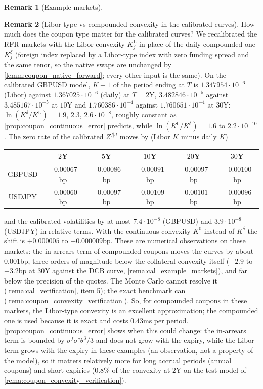 \documentclass[11pt,english]{amsart}
\theoremstyle{definition}
\newtheorem{rema}{Remark}
\begin{document}
\begin{rema}[Example markets]
\end{rema}

\begin{rema}[Libor-type vs compounded convexity in the calibrated curves]\label{rema:cal_libor_vs_rfr}
How much does the coupon type matter for the calibrated curves? We recalibrated the RFR markets with the Libor convexity $K^{\mathrm{L}}_j$ in place of the daily compounded one $K^\delta_j$ (foreign index replaced by a Libor-type index with zero funding spread and the same tenor, so the native swaps are unchanged by \autoref{lemm:coupon_native_forward}; every other input is the same). On the calibrated GBPUSD model, $K-1$ of the period ending at $T$ is $1.347954\cdot10^{-6}$ (Libor) against $1.367025\cdot10^{-6}$ (daily) at $T = 2$Y, $3.482846\cdot10^{-5}$ against $3.485167\cdot10^{-5}$ at $10$Y and $1.760386\cdot10^{-4}$ against $1.760651\cdot10^{-4}$ at $30$Y: $\ln(K^\delta/K^{\mathrm{L}}) = 1.9$, $2.3$, $2.6\cdot10^{-8}$, roughly constant as \autoref{prop:coupon_continuous_error} predicts, while $\ln(K^0/K^\delta) = 1.6$ to $2.2\cdot10^{-10}$. The zero rate of the calibrated $Z^{f|d}$ moves by (Libor $K$ minus daily $K$)
\begin{center}
\begin{tabular}{|c|c|c|c|c|c|}
\hline
 & $2$Y & $5$Y & $10$Y & $20$Y & $30$Y \\
\hline
GBPUSD & $-0.00067$bp & $-0.00086$bp & $-0.00091$bp & $-0.00097$bp & $-0.00100$bp \\
USDJPY & $-0.00060$bp & $-0.00097$bp & $-0.00109$bp & $-0.00101$bp & $-0.00096$bp \\
\hline
\end{tabular}
\end{center}
and the calibrated volatilities by at most $7.4\cdot10^{-8}$ (GBPUSD) and $3.9\cdot10^{-8}$ (USDJPY) in relative terms. With the continuous convexity $K^0$ instead of $K^\delta$ the shift is $+0.000005$ to $+0.000009$bp. These are numerical observations on these markets: the in-arrears term of compounded coupons moves the curves by about $0.001$bp, three orders of magnitude below the collateral convexity itself ($+2.9$ to $+3.2$bp at $30$Y against the DCB curve, \autoref{rema:cal_example_markets}), and far below the precision of the quotes. The Monte Carlo cannot resolve it (\autoref{rema:cal_verification}, item 5); the exact benchmark can (\autoref{rema:coupon_convexity_verification}). So, for compounded coupons in these markets, the Libor-type convexity is an excellent approximation; the compounded one is used because it is exact and costs $0.43$ms per period. \autoref{prop:coupon_continuous_error} shows when this could change: the in-arrears term is bounded by $\bar{\sigma}^f\bar{\sigma}^c\theta^3/3$ and does not grow with the expiry, while the Libor term grows with the expiry in these examples (an observation, not a property of the model), so it matters relatively more for long accrual periods (annual coupons) and short expiries ($0.8\%$ of the convexity at $2$Y on the test model of \autoref{rema:coupon_convexity_verification}).
\end{rema}
\end{document}

